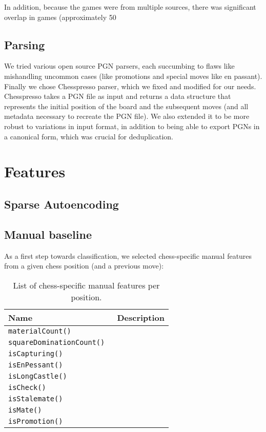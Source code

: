 \documentclass[11pt]{article}
\begin{document}
In addition, because the games were from multiple sources, there was significant overlap in games (approximately 50%

\subsection{Parsing}
We tried various open source PGN parsers, each succumbing to flaws like mishandling uncommon cases (like promotions and special moves like en passant). Finally we chose Chesspresso parser, which we fixed and modified for our needs. Chesspresso takes a PGN file as input and returns a data structure that represents the initial position of the board and the subsequent moves (and all metadata necessary to recreate the PGN file). We also extended it to be more robust to variations in input format, in addition to being able to export PGNs in a canonical form, which was crucial for deduplication.

\section{Features}

\subsection{Sparse Autoencoding}
\subsection{Manual baseline}
As a first step towards classification, we selected chess-specific manual features from a given chess position (and a previous move):
\begin{table*}
\begin{tabular}{lp{}}
\hline
\textbf{Name} & \textbf{Description} \\ \hline
\tt{materialCount()} & \\
\tt{squareDominationCount()} & \\
\tt{isCapturing()} & \\
\tt{isEnPessant()} & \\
\tt{isLongCastle()} & \\
\tt{isCheck()} & \\
\tt{isStalemate()} & \\
\tt{isMate()} & \\
\tt{isPromotion()} & \\

\end{tabular} 
\caption{List of chess-specific manual features per position.}
\end{table*}
\end{document}
